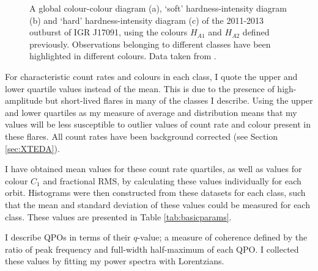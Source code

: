 \begin{figure}
\captionsetup{singlelinecheck=off}
\caption[Hardness-Intensity diagrams of IGR J17091-3524 during the 2011-2013 outburst, showing when each of variability classes I-IX were observed.]{A global colour-colour diagram (a), `soft' hardness-intensity diagram (b) and `hard' hardness-intensity diagram (c) of the 2011-2013 outburst of IGR J17091, using the colours $H_{A1}$ and $H_{A2}$ defined previously.  Observations belonging to different classes have been highlighted in different colours.  Data taken from \citealt{Altamirano_IGR_FH}.}
\label{fig:IIIisHarder}
\end{figure}

\par For characteristic count rates and colours in each class, I quote the upper and lower quartile values \citep{Kenney_Quartile} instead of the mean.  This is due to the presence of high-amplitude but short-lived flares in many of the classes I describe.  Using the upper and lower quartiles as my measure of average and distribution means that my values will be less susceptible to outlier values of count rate and colour present in these flares.  All count rates have been background corrected (see Section \ref{sec:XTEDA}).
\par I have obtained mean values for these count rate quartiles, as well as values for colour $C_1$ and fractional RMS, by calculating these values individually for each orbit.  Histograms were then constructed from these datasets for each class, such that the mean and standard deviation of these values could be measured for each class.  These values are presented in Table \ref{tab:basicparams}.
\par I describe QPOs in terms of their $q$-value\indexq; a measure of coherence defined by the ratio of peak frequency and full-width half-maximum of each QPO.  I collected these values by fitting my power spectra with Lorentzians.

